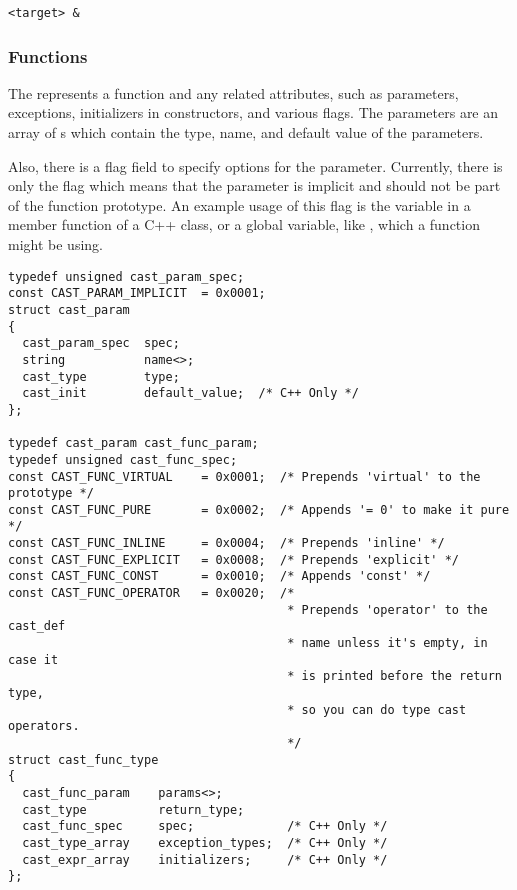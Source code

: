 \begin{verbatim}
<target> &
\end{verbatim}

\subsubsection{Functions}

The  represents a function and any related attributes,
such as parameters, exceptions, initializers in constructors, and various
flags.  The parameters are an array of s which contain
the type, name, and default value of the parameters.

Also, there is a flag field to specify options for the parameter.  Currently,
there is only the  flag which means that the
parameter is implicit and should not be part of the function prototype.  An
example usage of this flag is the  variable in a member
function of a C++ class, or a global variable, like , which
a function might be using.

\begin{verbatim}
typedef unsigned cast_param_spec;
const CAST_PARAM_IMPLICIT  = 0x0001;
struct cast_param
{
  cast_param_spec  spec;
  string           name<>;
  cast_type        type;
  cast_init        default_value;  /* C++ Only */
};

typedef cast_param cast_func_param;
typedef unsigned cast_func_spec;
const CAST_FUNC_VIRTUAL    = 0x0001;  /* Prepends 'virtual' to the prototype */
const CAST_FUNC_PURE       = 0x0002;  /* Appends '= 0' to make it pure */
const CAST_FUNC_INLINE     = 0x0004;  /* Prepends 'inline' */
const CAST_FUNC_EXPLICIT   = 0x0008;  /* Prepends 'explicit' */
const CAST_FUNC_CONST      = 0x0010;  /* Appends 'const' */
const CAST_FUNC_OPERATOR   = 0x0020;  /*
                                       * Prepends 'operator' to the cast_def
                                       * name unless it's empty, in case it
                                       * is printed before the return type,
                                       * so you can do type cast operators.
                                       */
struct cast_func_type
{
  cast_func_param    params<>;
  cast_type          return_type;
  cast_func_spec     spec;             /* C++ Only */
  cast_type_array    exception_types;  /* C++ Only */
  cast_expr_array    initializers;     /* C++ Only */
};
\end{verbatim}

